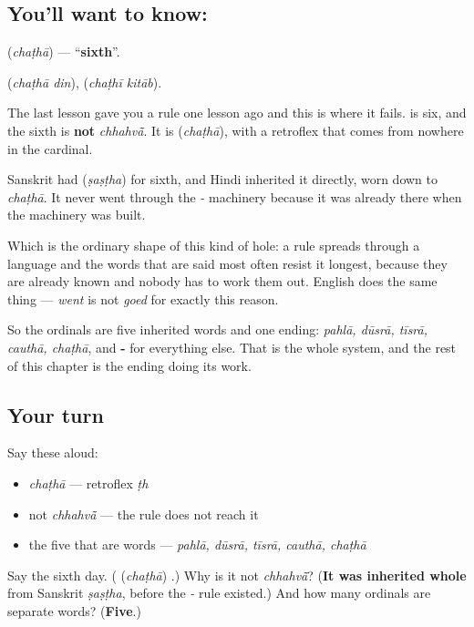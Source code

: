 \subsection*{You'll want to know: }
\textbf{} (\emph{chaṭhā}) — \textquotedblleft{}\textbf{sixth}\textquotedblright{}.

\textbf{ } (\emph{chaṭhā din}), \textbf{ } (\emph{chaṭhī kitāb}).

The last lesson gave you a rule one lesson ago and this is where it fails. \textbf{} is six, and the sixth is \textbf{not} \emph{chhahvā̃}. It is \textbf{} (\emph{chaṭhā}), with a retroflex \textbf{} that comes from nowhere in the cardinal.

\begin{cousinweb}
Sanskrit had \textbf{} (\emph{ṣaṣṭha}) for sixth, and Hindi inherited it directly, worn down to \emph{chaṭhā}. It never went through the \emph{-} machinery because it was already there when the machinery was built.

Which is the ordinary shape of this kind of hole: a rule spreads through a language and the words that are said most often resist it longest, because they are already known and nobody has to work them out. English does the same thing — \emph{went} is not \emph{goed} for exactly this reason.

So the ordinals are five inherited words and one ending: \emph{pahlā, dūsrā, tīsrā, cauthā, chaṭhā}, and \textbf{-} for everything else. That is the whole system, and the rest of this chapter is the ending doing its work.
\end{cousinweb}

\subsection*{Your turn}
Say these aloud:

\begin{itemize}
\raggedright
  \item \emph{chaṭhā} — retroflex \emph{ṭh}
  \item not \emph{chhahvā̃} — the rule does not reach it
  \item the five that are words — \emph{pahlā, dūsrā, tīsrā, cauthā, chaṭhā}
\end{itemize}

\begin{tcolorbox}[breakable,colback=teal!4,colframe=teal!35!black,title={Before you move on}]
Say the sixth day. (\textbf{} (\emph{chaṭhā}) \textbf{}.) Why is it not \emph{chhahvā̃}? (\textbf{It was inherited whole} from Sanskrit \emph{ṣaṣṭha}, before the \emph{-} rule existed.) And how many ordinals are separate words? (\textbf{Five}.)
\end{tcolorbox}
